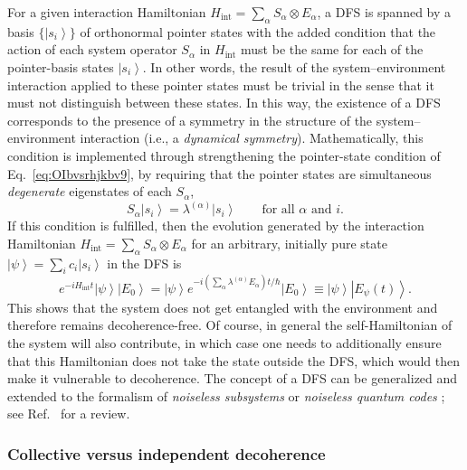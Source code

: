\documentclass[3p,sort&compress]{elsarticle}
\newcommand{\ket}[1]{\left\vert{#1}\right\rangle}
\newcommand{\E}{\ensuremath{e}}
\newcommand{\I}{\ensuremath{i}}
\newcommand{\op}[1]{#1}
\begin{document}
For a given interaction Hamiltonian $\op{H}_\text{int} =  \sum_\alpha \op{S}_\alpha \otimes \op{E}_\alpha$, a DFS is spanned by a basis $\{\ket{s_i}\}$ of orthonormal pointer states with the added condition that the action of each system operator $\op{S}_\alpha$ in $\op{H}_\text{int}$ must be the same for each of the pointer-basis states $\ket{s_i}$. In other words, the result of the system--environment interaction applied to these pointer states must be trivial in the sense that it must not distinguish between these states. In this way, the existence of a DFS corresponds to the presence of a symmetry in the structure of the system--environment interaction (i.e., a \emph{dynamical symmetry}). Mathematically, this condition is implemented through strengthening the pointer-state condition of Eq.~\eqref{eq:OIbvsrhjkbv9}, by requiring that the pointer states are simultaneous \emph{degenerate} eigenstates of each $\op{S}_\alpha$,
%
\begin{equation}
  \label{eq:OIbvsrhjkbvsfljvh9}
  \op{S}_\alpha \ket{s_i} = \lambda^{(\alpha)} \ket{s_i} \qquad
  \text{for all $\alpha$ and $i$}. 
\end{equation}
%
If this condition is fulfilled, then the evolution generated by the interaction Hamiltonian $\op{H}_\text{int} =  \sum_\alpha \op{S}_\alpha \otimes \op{E}_\alpha$ for an arbitrary, initially pure state $\ket{\psi} = \sum_i c_i \ket{s_i}$ in the DFS is 
%
\begin{equation}
  \label{eq:OIbvsrhjkbv9zFFHGSVCxc}
  \E^{-\I \op{H}_\text{int}t} \ket{\psi}\ket{E_0} = \ket{\psi}\E^{-\I
    \left( \sum_\alpha \lambda^{(\alpha)} E_\alpha \right)t/\hbar}
  \ket{E_0} \equiv \ket{\psi} \ket{E_\psi(t)}.
\end{equation}
%
This shows that the system does not get entangled with the environment and therefore remains decoherence-free. Of course, in general the self-Hamiltonian of the system will also contribute, in which case one needs to additionally ensure that this Hamiltonian does not take the state outside the DFS, which would then make it vulnerable to decoherence. The concept of a DFS can be generalized and extended to the formalism of \emph{noiseless subsystems} or \emph{noiseless quantum codes} \cite{Knill:2000:aa,Kempe:2001:oo,Lidar:2003:aa,Choi:2006:tt,Beny:2007:pp,BlumeKohout:2010:pp, Lidar:2014:pp}; see Ref.~\cite{Lidar:2014:pp} for a review.

\subsubsection{Collective versus independent decoherence}
\end{document}
